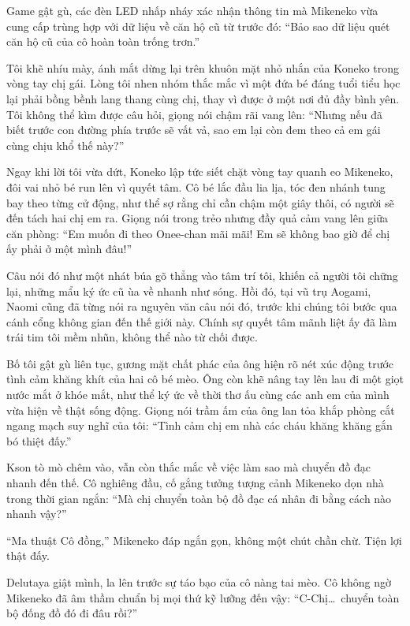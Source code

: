 ﻿\documentclass[../main.tex]{subfiles}
\begin{document}
Game gật gù, các đèn LED nhấp nháy xác nhận thông tin mà Mikeneko vừa cung cấp trùng hợp với dữ liệu về căn hộ cũ từ trước đó: ``Bảo sao dữ liệu quét căn hộ cũ của cô hoàn toàn trống trơn.''

Tôi khẽ nhíu mày, ánh mắt dừng lại trên khuôn mặt nhỏ nhắn của Koneko trong vòng tay chị gái. Lòng tôi nhen nhóm thắc mắc vì một đứa bé đáng tuổi tiểu học lại phải bồng bềnh lang thang cùng chị, thay vì được ở một nơi đủ đầy bình yên. Tôi không thể kìm được câu hỏi, giọng nói chậm rãi vang lên: ``Nhưng nếu đã biết trước con đường phía trước sẽ vất vả, sao em lại còn đem theo cả em gái cùng chịu khổ thế này?''

Ngay khi lời tôi vừa dứt, Koneko lập tức siết chặt vòng tay quanh eo Mikeneko, đôi vai nhỏ bé run lên vì quyết tâm. Cô bé lắc đầu lia lịa, tóc đen nhánh tung bay theo từng cử động, như thể sợ rằng chỉ cần chậm một giây thôi, có người sẽ đến tách hai chị em ra. Giọng nói trong trẻo nhưng đầy quả cảm vang lên giữa căn phòng: ``Em muốn đi theo Onee-chan mãi mãi! Em sẽ không bao giờ để chị ấy phải ở một mình đâu!''

Câu nói đó như một nhát búa gõ thẳng vào tâm trí tôi, khiến cả người tôi chững lại, những mẩu ký ức cũ ùa về nhanh như sóng. Hồi đó, tại vũ trụ Aogami, Naomi cũng đã từng nói ra nguyên văn câu nói đó, trước khi chúng tôi bước qua cánh cổng không gian đến thế giới này. Chính sự quyết tâm mãnh liệt ấy đã làm trái tim tôi mềm nhũn, không thể nào từ chối được.

Bố tôi gật gù liên tục, gương mặt chất phác của ông hiện rõ nét xúc động trước tình cảm khăng khít của hai cô bé mèo. Ông còn khẽ nâng tay lên lau đi một giọt nước mắt ở khóe mắt, như thể ký ức về thời thơ ấu cùng các anh em của mình vừa hiện về thật sống động. Giọng nói trầm ấm của ông lan tỏa khắp phòng cắt ngang mạch suy nghĩ của tôi: ``Tình cảm chị em nhà các cháu khăng khăng gắn bó thiệt đấy.''

Kson tò mò chêm vào, vẫn còn thắc mắc về việc làm sao mà chuyển đồ đạc nhanh đến thế. Cô nghiêng đầu, cố gắng tưởng tượng cảnh Mikeneko dọn nhà trong thời gian ngắn: ``Mà chị chuyển toàn bộ đồ đạc cá nhân đi bằng cách nào nhanh vậy?''

``Ma thuật Cô đồng,'' Mikeneko đáp ngắn gọn, không một chút chần chừ. Tiện lợi thật đấy.

Delutaya giật mình, la lên trước sự táo bạo của cô nàng tai mèo. Cô không ngờ Mikeneko đã âm thầm chuẩn bị mọi thứ kỹ lưỡng đến vậy: ``C-Chị\dots\ chuyển toàn bộ đống đồ đó đi đâu rồi?''
\end{document}
